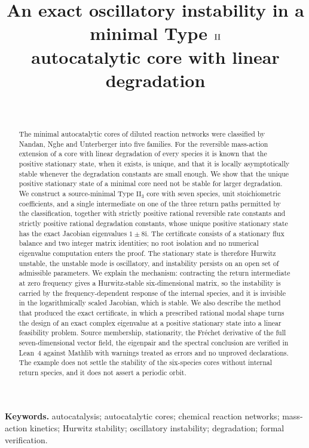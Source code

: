 \documentclass[11pt,a4paper]{article}
\title{An exact oscillatory instability in a minimal Type $\II$\\ autocatalytic core with linear degradation}
\author{\PaperAuthor\\ \PaperAffiliation}
\date{\PaperDate}
\theoremstyle{plain}
\theoremstyle{definition}
\theoremstyle{remark}
\numberwithin{equation}{section}
\newcommand{\II}{\mathrm{II}}
\newcommand{\iu}{\mathrm{i}}
\begin{document}
\maketitle

\begin{abstract}
The minimal autocatalytic cores of diluted reaction networks were classified by Nandan, Nghe and Unterberger into five families. For the reversible mass-action extension of a core with linear degradation of every species it is known that the positive stationary state, when it exists, is unique, and that it is locally asymptotically stable whenever the degradation constants are small enough. We show that the unique positive stationary state of a minimal core need not be stable for larger degradation. We construct a source-minimal Type $\II_3$ core with seven species, unit stoichiometric coefficients, and a single intermediate on one of the three return paths permitted by the classification, together with strictly positive rational reversible rate constants and strictly positive rational degradation constants, whose unique positive stationary state has the exact Jacobian eigenvalues $1\pm8\iu$. The certificate consists of a stationary flux balance and two integer matrix identities; no root isolation and no numerical eigenvalue computation enters the proof. The stationary state is therefore Hurwitz unstable, the unstable mode is oscillatory, and instability persists on an open set of admissible parameters. We explain the mechanism: contracting the return intermediate at zero frequency gives a Hurwitz-stable six-dimensional matrix, so the instability is carried by the frequency-dependent response of the internal species, and it is invisible in the logarithmically scaled Jacobian, which is stable. We also describe the method that produced the exact certificate, in which a prescribed rational modal shape turns the design of an exact complex eigenvalue at a positive stationary state into a linear feasibility problem. Source membership, stationarity, the Fr\'echet derivative of the full seven-dimensional vector field, the eigenpair and the spectral conclusion are verified in Lean~4 against Mathlib with warnings treated as errors and no unproved declarations. The example does not settle the stability of the six-species cores without internal return species, and it does not assert a periodic orbit.
\end{abstract}

\noindent\textbf{Keywords.} autocatalysis; autocatalytic cores; chemical reaction networks; mass-action kinetics; Hurwitz stability; oscillatory instability; degradation; formal verification.
\end{document}
